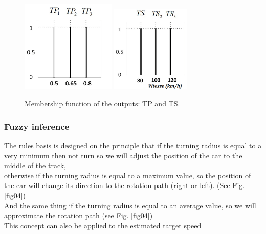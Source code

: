 \documentclass{llncs}
\begin{document}
\begin{figure}[h!]
	
	\centering
	\includegraphics[width=0.4\textwidth]{fig/dis.PNG}
	\includegraphics[width=0.34\textwidth]{fig/speed1.PNG}
	\begin{minipage}{10cm}
		\centering
		\caption{\footnotesize Membership function of the outputs: TP and TS.}
		\label{fig38}
	\end{minipage} 
	
\end{figure}
\subsubsection{Fuzzy inference}
The rules basis is designed on the principle that if the turning radius is equal to a very minimum then not turn so we will adjust the position of the car to the middle of the track, \\
otherwise if the turning radius is equal to a maximum value, so the position of the car will change its direction to the rotation path (right or left). (See Fig. \ref {fig04}) \\
And the same thing if the turning radius is equal to an average value, so we will approximate the rotation path (see Fig. \ref{fig04}) \\
This concept can also be applied to the estimated target speed \\
\end{document}
